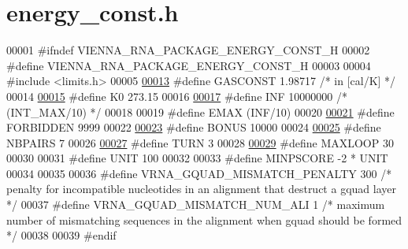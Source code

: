 \hypertarget{energy__const_8h_source}{}\section{energy\+\_\+const.\+h}
\label{energy__const_8h_source}

\begin{DoxyCode}
00001 \textcolor{preprocessor}{#ifndef VIENNA\_RNA\_PACKAGE\_ENERGY\_CONST\_H}
00002 \textcolor{preprocessor}{#define VIENNA\_RNA\_PACKAGE\_ENERGY\_CONST\_H}
00003 
00004 \textcolor{preprocessor}{#include <limits.h>}
00005 
\hypertarget{energy__const_8h_source.tex_l00013}{}\hyperlink{energy__const_8h_ab1e4a8d82f24ed5db01dde5f25269cf1}{00013} \textcolor{preprocessor}{#define GASCONST 1.98717  }\textcolor{comment}{/* in [cal/K] */}\textcolor{preprocessor}{}
00014 
\hypertarget{energy__const_8h_source.tex_l00015}{}\hyperlink{energy__const_8h_a307c72605e3713972b4f4fb2d53ea20e}{00015} \textcolor{preprocessor}{#define K0  273.15}
00016 
\hypertarget{energy__const_8h_source.tex_l00017}{}\hyperlink{energy__const_8h_a12c2040f25d8e3a7b9e1c2024c618cb6}{00017} \textcolor{preprocessor}{#define INF 10000000 }\textcolor{comment}{/* (INT\_MAX/10) */}\textcolor{preprocessor}{}
00018 
00019 \textcolor{preprocessor}{#define EMAX (INF/10)}
00020 
\hypertarget{energy__const_8h_source.tex_l00021}{}\hyperlink{energy__const_8h_a5064c29ab2d1e20c2304b3c67562774d}{00021} \textcolor{preprocessor}{#define FORBIDDEN 9999}
00022 
\hypertarget{energy__const_8h_source.tex_l00023}{}\hyperlink{energy__const_8h_a96a9822fa134450197dd454b1478a193}{00023} \textcolor{preprocessor}{#define BONUS 10000}
00024 
\hypertarget{energy__const_8h_source.tex_l00025}{}\hyperlink{energy__const_8h_a5e75221c779d618eab81e096f37e32ce}{00025} \textcolor{preprocessor}{#define NBPAIRS 7}
00026 
\hypertarget{energy__const_8h_source.tex_l00027}{}\hyperlink{energy__const_8h_ae646250fd59311356c7e5722a81c3a96}{00027} \textcolor{preprocessor}{#define TURN 3}
00028 
\hypertarget{energy__const_8h_source.tex_l00029}{}\hyperlink{energy__const_8h_ad1bd6eabac419670ddd3c9ed82145988}{00029} \textcolor{preprocessor}{#define MAXLOOP 30}
00030 
00031 \textcolor{preprocessor}{#define UNIT 100}
00032 
00033 \textcolor{preprocessor}{#define MINPSCORE -2 * UNIT}
00034 
00035 
00036 \textcolor{preprocessor}{#define   VRNA\_GQUAD\_MISMATCH\_PENALTY   300   }\textcolor{comment}{/* penalty for incompatible nucleotides in an alignment that
       destruct a gquad layer */}\textcolor{preprocessor}{}
00037 \textcolor{preprocessor}{#define   VRNA\_GQUAD\_MISMATCH\_NUM\_ALI   1   }\textcolor{comment}{/* maximum number of mismatching sequences in the alignment
       when gquad should be formed */}\textcolor{preprocessor}{}
00038 
00039 \textcolor{preprocessor}{#endif}
\end{DoxyCode}
